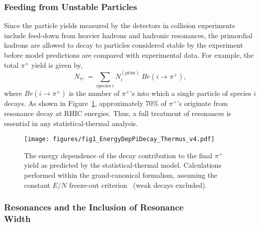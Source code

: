 \documentclass{elsarticle}
\begin{document}
\subsubsection{Feeding from Unstable Particles}

Since the particle yields measured by the detectors in collision experiments include 
feed-down from heavier hadrons and hadronic resonances, the primordial
hadrons are allowed to decay to particles considered stable by the
experiment before model predictions are compared with experimental
data. For example, the total $\pi^+$ yield is given by,
\begin{equation}
N_{\pi^+} = \sum_{\mathrm{species}\;i}N_i^{(\mathrm{prim})}\:Br(i\rightarrow \pi^+), 
\end{equation}
where $Br(i\rightarrow \pi^+)$ is the number of $\pi^+$'s into which a single 
particle of species $i$ decays. As shown in Figure~\ref{PiDecay}, approximately 
70\% of $\pi^+$'s originate from resonance decay at RHIC energies. Thus, a full 
treatment of resonances is essential in any statistical-thermal analysis.\\


 
\begin{figure}
\begin{center}
\texttt{[image: figures/fig1\_EnergyDepPiDecay\_Thermus\_v4.pdf]}
\end{center}
\caption{The energy dependence of the decay contribution to the final $\pi^+$ yield as predicted by the 
statistical-thermal model. Calculations performed within the grand-canonical formalism, 
assuming the constant $E/N$ freeze-out criterion~\cite{Cleymans:1998fq,Cleymans:1999st} (weak decays excluded).}\label{PiDecay}
\end{figure}

\subsubsection[Resonances and the Inclusion of Resonance
        Width]{Resonances and the Inclusion of Resonance\\
        Width}\label{SubSection::ResonanceWidth}
\end{document}
